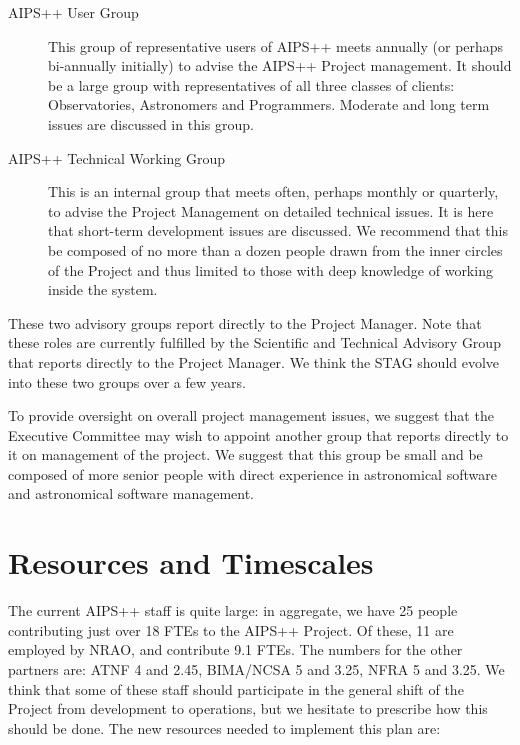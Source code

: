 \begin{description}
\item[AIPS++ User Group] This group of representative users of AIPS++ 
meets annually (or perhaps bi-annually initially) to advise the AIPS++
Project management.  It should be a large group with representatives
of all three classes of clients: Observatories, Astronomers and
Programmers. Moderate and long term issues are discussed in this
group.
\item[AIPS++ Technical Working Group] This is an internal group that
meets often, perhaps monthly or quarterly, to advise the Project
Management on detailed technical issues. It is here that short-term
development issues are discussed. We recommend that this be composed of
no more than a dozen people drawn from the inner circles of the Project
and thus limited to those with deep knowledge of working inside the
system.
\end{description}

These two advisory groups report directly to the Project Manager. Note
that these roles are currently fulfilled by the Scientific and Technical
Advisory Group that reports directly to the Project Manager. We think the
STAG should evolve into these two groups over a few years.

To provide oversight on overall project management issues, we suggest
that the Executive Committee may wish to appoint another group that
reports directly to it on management of the project. We suggest that
this group be small and be composed of more senior people with direct
experience in astronomical software and astronomical software management.

\section{Resources and Timescales}

The current AIPS++ staff is quite large: in aggregate, we have 25
people contributing just over 18 FTEs to the AIPS++ Project. Of these,
11 are employed by NRAO, and contribute 9.1 FTEs. The numbers for the
other partners are: ATNF 4 and 2.45, BIMA/NCSA 5 and 3.25, NFRA 5 and
3.25. We think that some of these staff should participate in the
general shift of the Project from development to operations, but we
hesitate to prescribe how this should be done. The new resources
needed to implement this plan are:

